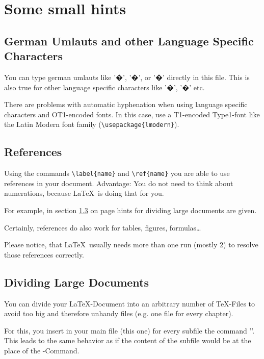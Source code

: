 
\chapter{Some small hints}\label{hints}

\section{German Umlauts and other Language Specific Characters}\label{umlauts}
You can type german umlauts like '�', '�', or '�' directly in this file.
This is also true for other language specific characters like '�', '�' etc.

There are problems with automatic hyphenation when using language
specific characters and OT1-encoded fonts. In this case, use a
T1-encoded Type1-font like the Latin Modern font family (\verb#\usepackage{lmodern}#).


\section{References}\label{references}
Using the commands \verb#\label{name}# and \verb#\ref{name}# you are able
to use references in your document. Advantage: You do not need to think
about numerations, because \LaTeX\ is doing that for you.

For example, in section \ref{dividing} on page \pageref{dividing} hints for
dividing large documents are given.

Certainly, references do also work for tables, figures, formulas\ldots

Please notice, that \LaTeX\ usually needs more than one run (mostly 2) to
resolve those references correctly.


\section{Dividing Large Documents}\label{dividing}
You can divide your \LaTeX-Document into an arbitrary number of \TeX-Files
to avoid too big and therefore unhandy files (e.g. one file for every chapter).

For this, you insert in your main file (this one) for every subfile
the command '\verb##'. This leads to the same behavior
as if the content of the subfile would be at the place of the \verb##-Command.

